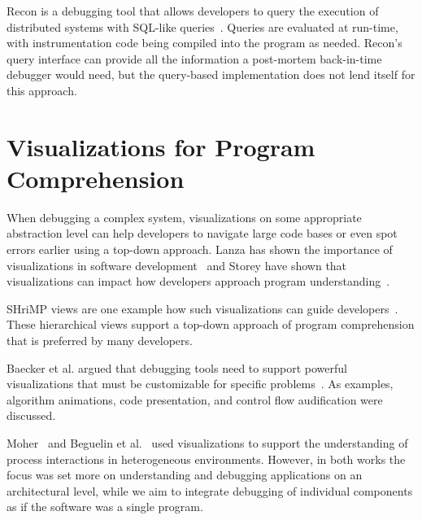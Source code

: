 Recon is a debugging tool that allows developers to query the execution of distributed systems with SQL-like queries~\cite{lee11:unified_debugging_of_distributed}.
Queries are evaluated at run-time, with instrumentation code being compiled into the program as needed. 
Recon's query interface can provide all the information a post-mortem back-in-time debugger would need, but the query-based implementation does not lend itself for this approach.


%
%



\section{Visualizations for Program Comprehension}
\label{sec:rw_visualization}

When debugging a complex system, visualizations on some appropriate abstraction level can help developers to navigate large code bases or even spot errors earlier using a top-down approach.
Lanza has shown the importance of visualizations in software development~\cite{lanza03:program_visualization_support}
and Storey \etal have shown that visualizations can impact how developers approach program understanding~\cite{storey97:how_do_program_understanding}.


SHriMP views are one example how such visualizations can guide developers~\cite{storey02:shrimp_views_an_interactive}.
These hierarchical views support a top-down approach of program comprehension that is preferred by many developers.

Baecker et al. argued that debugging tools need to support powerful visualizations that must be customizable for specific problems~\cite{baecker97:software_visualization_for_debugging}.
As examples, algorithm animations, code presentation, and control flow audification were discussed.


Moher~\cite{moher88:provide_a_process_visualization} and Beguelin et al.~\cite{beguelin93:visualization_and_debugging} used visualizations to support the understanding of process interactions in heterogeneous environments.
However, in both works the focus was set more on understanding and debugging applications on an architectural level, while we aim to integrate debugging of individual components as if the software was a single program.

